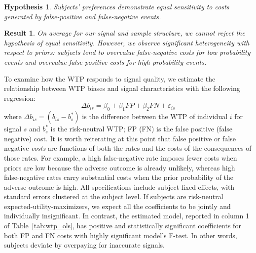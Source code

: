 \documentclass[12pt,a4paper]{article}
\newtheorem{hypothesis}{Hypothesis}
\newtheorem{result}{Result}
\begin{document}

%






\begin{hypothesis}\label{hyp:eqSen} 
Subjects' preferences demonstrate equal sensitivity to costs generated by false-positive and false-negative events. 
\end{hypothesis}

\begin{result} 
On average for our signal and sample structure, we cannot reject the hypothesis of equal sensitivity. However, we observe significant heterogeneity with respect to priors: subjects tend to overvalue false-negative costs for low probability events and overvalue false-positive costs for high probability events. 
\end{result}


To examine how the WTP responds to signal quality, we estimate the relationship between WTP biases and signal characteristics with the following regression:
\[\Delta b_{is} = \beta_0 + \beta_1 FP + \beta_2 FN + \varepsilon_{is}\]
where $\Delta b_{is} = (b_{is} - b^*_s)$ is the difference between the WTP of individual $i$ for signal $s$ and $b^*_s$ is the risk-neutral WTP; FP (FN) is the false positive (false negative) cost.  It is worth reiterating at this point that false positive or false negative \textit{costs} are functions of both the rates and the costs of the consequences of those rates.  For example, a high false-negative rate imposes fewer costs when priors are low because the adverse outcome is already unlikely, whereas high false-negative rates carry substantial costs when the prior probability of the adverse outcome is high. All specifications include subject fixed effects, with standard errors clustered at the subject level. If subjects are risk-neutral expected-utility-maximizers, we expect all the coefficients to be jointly and individually insignificant. In contrast, the estimated model, reported in column 1 of Table~\ref{tab:wtp_ols}, has positive and statistically significant coefficients for both FP and FN costs with highly significant model's F-test. In other words, subjects deviate by overpaying for inaccurate signals. 
\end{document}
